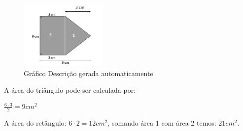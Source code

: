 \begin{escolha}
\begin{boxmedio}
\begin{boxmedio}
{\begin{boxpeq}
\begin{boxpeq}
{\begin{boxpeq}
\begin{boxmedio}
\begin{boxmedio}
\begin{boxpeq}
\begin{boxmedio}
\begin{boxpeq}
\begin{boxpeq}
\begin{boxpeq}
\begin{boxpeq}
\begin{boxmedio}
{\begin{boxmedio}
\begin{boxmedio}
\begin{boxpeq}
\begin{boxmedio}
\begin{boxpeq}
\begin{boxpeq}
\begin{boxpeq}
\begin{escolha}
{\begin{boxmedio}
\begin{boxpeq}
\begin{boxpeq}
\begin{boxpeq}
\begin{boxpeq}
\begin{boxpeq}
\begin{boxmedio}
\begin{boxpeq}
\begin{boxpeq}
\begin{boxpeq}
{\begin{boxpeq}
\begin{boxmedio}
\begin{boxpeq}
\begin{boxpeq}
\begin{boxpeq}
{\begin{boxpeq}
\begin{boxmedio}
{\begin{boxpeq}
\begin{boxpeq}
\begin{boxmedio}
\begin{boxmedio}
\begin{boxpeq}
\begin{boxpeq}
{\begin{boxpeq}
\begin{boxpeq}
\begin{boxpeq}
\begin{boxpeq}
\begin{boxpeq}
\begin{escolha}
\begin{escolha}
{\begin{boxmedio}
\begin{boxpeq}
\begin{q°}
\begin{boxmedio}
\begin{boxpeq}
\begin{boxpeq}
\begin{boxmedio}
\begin{boxmedio}
\begin{boxmedio}
\begin{boxmedio}
{\begin{enumerate}
\begin{boxpeq}
{\begin{boxpeq}
\begin{boxpeq}
\begin{boxmedio}
\begin{boxpeq}
\begin{boxpeq}
\begin{boxpeq}
{\begin{boxpeq}
\begin{boxmedio}
{\begin{figure}
\centering
\includegraphics[width=1.65556in,height=1.32674in]{./_SAEB_9_MAT/media/image232.png}
\caption{Gráfico Descrição gerada automaticamente}
\end{figure}

A área do triângulo pode ser calculada por:

$\frac{6 \cdot 3}{2} = 9 cm^2$

A área do retângulo: $6 \cdot 2 = 12 cm^2$, somando área 1 com área 2 temos: $21
cm^2$.}


\end{boxmedio}
\end{boxpeq}}
\end{boxpeq}
\end{boxpeq}
\end{boxpeq}
\end{boxmedio}
\end{boxpeq}
\end{boxpeq}}
\end{boxpeq}
\end{enumerate}}
\end{boxmedio}
\end{boxmedio}
\end{boxmedio}
\end{boxmedio}
\end{boxpeq}
\end{boxpeq}
\end{boxmedio}
\end{q°}
\end{boxpeq}
\end{boxmedio}}
\end{escolha}
\end{escolha}
\end{boxpeq}
\end{boxpeq}
\end{boxpeq}
\end{boxpeq}
\end{boxpeq}}
\end{boxpeq}
\end{boxpeq}
\end{boxmedio}
\end{boxmedio}
\end{boxpeq}
\end{boxpeq}}
\end{boxmedio}
\end{boxpeq}}
\end{boxpeq}
\end{boxpeq}
\end{boxpeq}
\end{boxmedio}
\end{boxpeq}}
\end{boxpeq}
\end{boxpeq}
\end{boxpeq}
\end{boxmedio}
\end{boxpeq}
\end{boxpeq}
\end{boxpeq}
\end{boxpeq}
\end{boxpeq}
\end{boxmedio}}
\end{escolha}
\end{boxpeq}
\end{boxpeq}
\end{boxpeq}
\end{boxmedio}
\end{boxpeq}
\end{boxmedio}
\end{boxmedio}}
\end{boxmedio}
\end{boxpeq}
\end{boxpeq}
\end{boxpeq}
\end{boxpeq}
\end{boxmedio}
\end{boxpeq}
\end{boxmedio}
\end{boxmedio}
\end{boxpeq}}
\end{boxpeq}
\end{boxpeq}}
\end{boxmedio}
\end{boxmedio}
\end{escolha}
